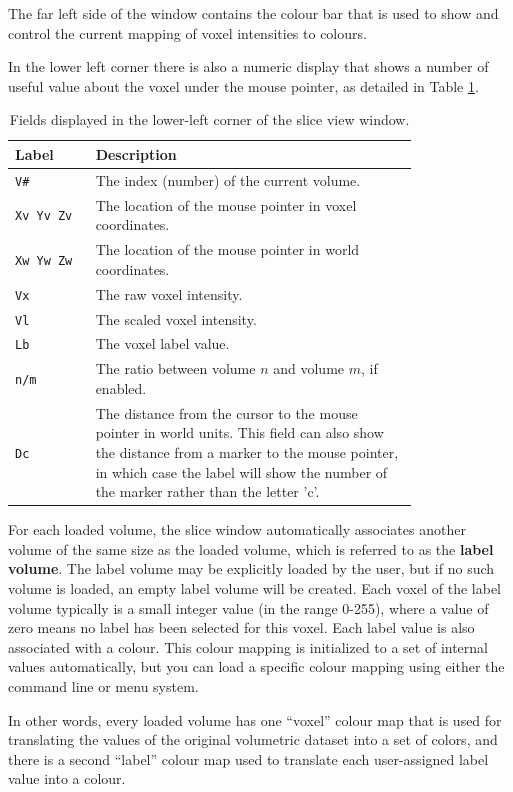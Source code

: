 \documentclass[11pt,letterpaper]{article}
\newcommand{\ident}[1]{{\tt #1}}
\begin{document}
The far left side of the window contains the colour bar that is used
to show and control the current mapping of voxel intensities to
colours. 

In the lower left corner there is also a numeric display that shows a
number of useful value about the voxel under the mouse pointer, as
detailed in Table \ref{tabSliceFields}.
\begin{table}
\centering
\caption{Fields displayed in the lower-left corner of the slice view window.}
\begin{tabular}{lp{0.8\linewidth}}
Label & Description \\
\hline
\ident{V\#} & The index (number) of the current volume. \\
\ident{Xv Yv Zv} & The location of the mouse pointer in voxel coordinates. \\
\ident{Xw Yw Zw} & The location of the mouse pointer in world coordinates. \\
\ident{Vx} & The raw voxel intensity. \\
\ident{Vl} & The scaled voxel intensity. \\
\ident{Lb} & The voxel label value. \\
\ident{n/m} & The ratio between volume $n$ and volume $m$, if enabled. \\
\ident{Dc} & The distance from the cursor to the mouse pointer in world units. This field can also show the distance from a marker to the mouse pointer, in which case the label will show the number of the marker rather than the letter 'c'. \\
\hline
\end{tabular}
\label{tabSliceFields}
\end{table}

For each loaded volume, the slice window automatically associates
another volume of the same size as the loaded volume, which is
referred to as the {\bf label volume}. The label volume may be
explicitly loaded by the user, but if no such volume is loaded, an
empty label volume will be created. Each voxel of the label volume
typically is a small integer value (in the range 0-255), where a value
of zero means no label has been selected for this voxel. Each label
value is also associated with a colour. This colour mapping is
initialized to a set of internal values automatically, but you can
load a specific colour mapping using either the command line or menu
system.

In other words, every loaded volume has one ``voxel'' colour map that
is used for translating the values of the original volumetric dataset
into a set of colors, and there is a second ``label'' colour map used
to translate each user-assigned label value into a colour.
\end{document}
